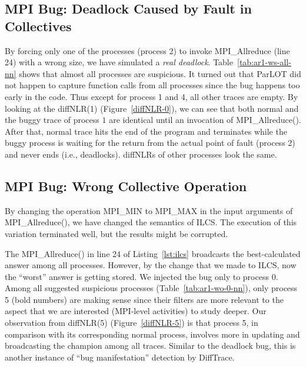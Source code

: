 \subsection{MPI Bug: Deadlock Caused by Fault in Collectives}
By forcing only one of the processes (process 2) to invoke MPI\_Allreduce (line 24) with a wrong size, we have simulated a \textit{real deadlock}. 
%
Table~\ref{tab:ar1-ws-all-nn} shows that almost all processes are suspicious.
%
It turned out that ParLOT did not happen to capture function calls from all processes since the bug happens too early in the code. Thus except for process 1 and 4, all other traces are empty.
%
By looking at the diffNLR(1) (Figure~\ref{diffNLR-0}), we can see that both normal and the buggy trace of process $1$ are identical until an invocation of MPI\_Allreduce(). After that, normal trace hits the end of the program and terminates while the buggy process is waiting for the return from the actual point of fault (process 2) and never ends (i.e., deadlocks). 
%
diffNLRs of other processes look the same.
%

%

%





\subsection{MPI Bug: Wrong Collective Operation}
By changing the operation MPI\_MIN to MPI\_MAX in the input arguments of MPI\_Allreduce(), we have changed the semantics of ILCS. 
%
The execution of this variation terminated well, but the results might be corrupted.
%

The MPI\_Allreduce() in line 24 of Listing~\ref{lst:ilcs} broadcasts the best-calculated answer among all processes.
%
However, by the change that we made to ILCS, now the ``worst'' answer is getting stored.
%
We injected the bug only to process 0.
%
Among all suggested suspicious processes (Table~\ref{tab:ar1-wo-0-nn}), only process 5 (bold numbers) are making sense since their filters are more relevant to the aspect that we are interested (MPI-level activities) to study deeper.
%
Our observation from diffNLR(5) (Figure~\ref{diffNLR-5}) is that process 5, in comparison with its corresponding normal process, involves more in updating and broadcasting the champion among all traces.
%
Similar to the deadlock bug, this is another instance of  ``bug manifestation'' detection by DiffTrace.






